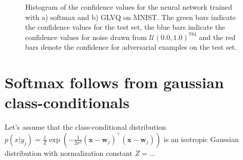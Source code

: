 \documentclass{esannV2}
\begin{document}
\begin{figure}[ht]
\caption{Histogram of the confidence values for the neural network trained with a) softmax and b) GLVQ on MNIST. The green bars indicate the confidence values for the test set, the blue bars indicate the confidence values for noise drawn from $\mathcal{U}(0.0, 1.0)^{784}$ and the red bars denote the confidence for adversarial examples on the test set. }
\end{figure}


\begin{footnotesize}





\end{footnotesize}

\appendix
\section{Softmax follows from gaussian class-conditionals}
Let's assume that the class-conditional distribution $p(x|y_j) = \frac{1}{Z} \exp(-\frac{1}{2\sigma^2}(\mathbf{x} - \mathbf{w}_j)^{\top}(\mathbf{x} - \mathbf{w}_j))$ is an isotropic Gaussian distribution with normalization constant $Z = ..$. 
\end{document}
